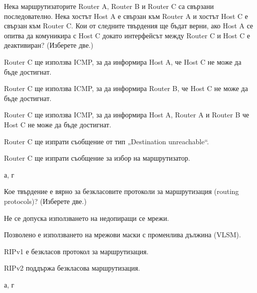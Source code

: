 \begin{q}
  Нека маршрутизаторите Router A, Router B и Router C са свързани
  последователно. Нека хостът Host A е свързан към Router A и хостът Host C е
  свързан към Router C. Кои от следните твърдения ще бъдат верни, ако Host A се
  опитва да комуникира с Host C докато интерфейсът между Router C и Host C е
  деактивиран? (Изберете две.)

  \begin{defractors}
  \item Router C ще използва ICMP, за да информира Host A, че Host C не може да
    бъде достигнат.
  \item Router C ще използва ICMP, за да информира Router B, че Host C не може
    да бъде достигнат.
  \item Router C ще използва ICMP, за да информира Host A, Router A и Router B
    че Host C не може да бъде достигнат.
  \item Router C ще изпрати съобщение от тип „Destination unreachable“.
  \item Router C ще изпрати съобщение за избор на маршрутизатор.
  \end{defractors}

  \rans а, г
\end{q}

\begin{q}
  Кое твърдение е вярно за безкласовите протоколи за маршрутизация (routing
  protocols)? (Изберете две.)

  \begin{defractors}
  \item Не се допуска използването на недопиращи се мрежи.
  \item Позволено е използването на мрежови маски с променлива дължина (VLSM).
  \item RIPv1 е безкласов протокол за маршрутизация.
  \item RIPv2 поддържа безкласова маршрутизация.
  \end{defractors}

  \rans а, г
\end{q}

